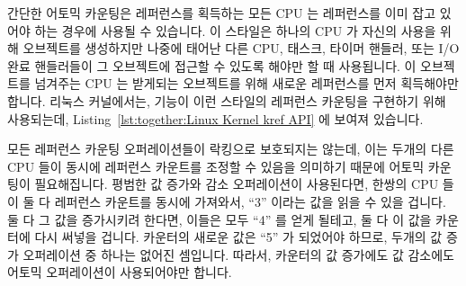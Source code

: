 간단한 어토믹 카운팅은 레퍼런스를 획득하는 모든 CPU 는 레퍼런스를 이미 잡고
있어야 하는 경우에 사용될 수 있습니다.
이 스타일은 하나의 CPU 가 자신의 사용을 위해 오브젝트를 생성하지만 나중에
태어난 다른 CPU, 태스크, 타이머 핸들러, 또는 I/O 완료 핸들러들이 그 오브젝트에
접근할 수 있도록 해야만 할 때 사용됩니다.
이 오브젝트를 넘겨주는 CPU 는 받게되는 오브젝트를 위해 새로운 레퍼런스를 먼저
획득해야만 합니다.
리눅스 커널에서는,  기능이 이런 스타일의 레퍼런스 카운팅을 구현하기
위해 사용되는데,
Listing~\ref{lst:together:Linux Kernel kref API} 에 보여져 있습니다.
\iffalse

Simple atomic counting may be used in cases where any CPU acquiring
a reference must already hold a reference.
This style is used when a single CPU creates an object for its
own private use, but must allow other CPU, tasks, timer handlers,
or I/O completion handlers that it later spawns to also access this object.
Any CPU that hands the object off must first acquire a new reference
on behalf of the recipient object.
In the Linux kernel, the \co{kref} primitives are used to implement
this style of reference counting, as shown in
Listing~\ref{lst:together:Linux Kernel kref API}.
\fi

모든 레퍼런스 카운팅 오퍼레이션들이 락킹으로 보호되지는 않는데, 이는 두개의
다른 CPU 들이 동시에 레퍼런스 카운트를 조정할 수 있음을 의미하기 때문에 어토믹
카운팅이 필요해집니다.
평범한 값 증가와 감소 오퍼레이션이 사용된다면, 한쌍의 CPU 들이 둘 다 레퍼런스
카운트를 동시에 가져와서, ``3'' 이라는 값을 읽을 수 있을 겁니다.
둘 다 그 값을 증가시키려 한다면, 이들은 모두 ``4'' 를 얻게 될테고, 둘 다 이
값을 카운터에 다시 써넣을 겁니다.
카운터의 새로운 값은 ``5'' 가 되었어야 하므로, 두개의 값 증가 오퍼레이션 중
하나는 없어진 셈입니다.
따라서, 카운터의 값 증가에도 값 감소에도 어토믹 오퍼레이션이 사용되어야만
합니다.
\iffalse

Atomic counting is required
because locking is not used to protect all reference-count operations,
which means that it is possible for two different CPUs to concurrently
manipulate the reference count.
If normal increment and decrement were used, a pair of CPUs might both
fetch the reference count concurrently, perhaps both obtaining
the value ``3''.
If both of them increment their value, they will both obtain ``4'',
and both will store this value back into the counter.
Since the new value of the counter should instead be ``5'', one
of the two increments has been lost.
Therefore, atomic operations must be used both for counter increments
and for counter decrements.
\fi

